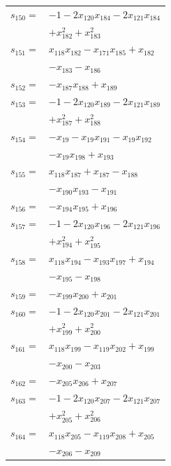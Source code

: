 \begin{longtable}{@{}r@{\;}l@{}}
\(s_{150}=\) & \(\displaystyle -1 -2x_{120}x_{184} -2x_{121}x_{184}\) \\
 & \(\displaystyle +x_{182}^{2} +x_{183}^{2}\) \\[3pt]
\(s_{151}=\) & \(\displaystyle x_{118}x_{182} -x_{171}x_{185} +x_{182}\) \\
 & \(\displaystyle -x_{183} -x_{186}\) \\[3pt]
\(s_{152}=\) & \(\displaystyle -x_{187}x_{188} +x_{189}\) \\[3pt]
\(s_{153}=\) & \(\displaystyle -1 -2x_{120}x_{189} -2x_{121}x_{189}\) \\
 & \(\displaystyle +x_{187}^{2} +x_{188}^{2}\) \\[3pt]
\(s_{154}=\) & \(\displaystyle -x_{19} -x_{19}x_{191} -x_{19}x_{192}\) \\
 & \(\displaystyle -x_{19}x_{198} +x_{193}\) \\[3pt]
\(s_{155}=\) & \(\displaystyle x_{118}x_{187} +x_{187} -x_{188}\) \\
 & \(\displaystyle -x_{190}x_{193} -x_{191}\) \\[3pt]
\(s_{156}=\) & \(\displaystyle -x_{194}x_{195} +x_{196}\) \\[3pt]
\(s_{157}=\) & \(\displaystyle -1 -2x_{120}x_{196} -2x_{121}x_{196}\) \\
 & \(\displaystyle +x_{194}^{2} +x_{195}^{2}\) \\[3pt]
\(s_{158}=\) & \(\displaystyle x_{118}x_{194} -x_{193}x_{197} +x_{194}\) \\
 & \(\displaystyle -x_{195} -x_{198}\) \\[3pt]
\(s_{159}=\) & \(\displaystyle -x_{199}x_{200} +x_{201}\) \\[3pt]
\(s_{160}=\) & \(\displaystyle -1 -2x_{120}x_{201} -2x_{121}x_{201}\) \\
 & \(\displaystyle +x_{199}^{2} +x_{200}^{2}\) \\[3pt]
\(s_{161}=\) & \(\displaystyle x_{118}x_{199} -x_{119}x_{202} +x_{199}\) \\
 & \(\displaystyle -x_{200} -x_{203}\) \\[3pt]
\(s_{162}=\) & \(\displaystyle -x_{205}x_{206} +x_{207}\) \\[3pt]
\(s_{163}=\) & \(\displaystyle -1 -2x_{120}x_{207} -2x_{121}x_{207}\) \\
 & \(\displaystyle +x_{205}^{2} +x_{206}^{2}\) \\[3pt]
\(s_{164}=\) & \(\displaystyle x_{118}x_{205} -x_{119}x_{208} +x_{205}\) \\
 & \(\displaystyle -x_{206} -x_{209}\) \\[3pt]

\end{longtable}
